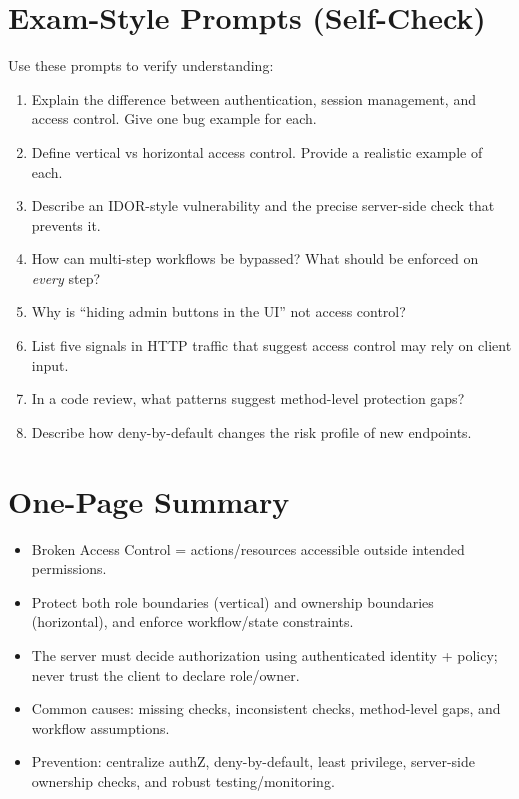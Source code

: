 \documentclass[11pt]{article}
\begin{document}
\section{Exam-Style Prompts (Self-Check)}
Use these prompts to verify understanding:
\begin{enumerate}
  \item Explain the difference between authentication, session management, and access control. Give one bug example for each.
  \item Define vertical vs horizontal access control. Provide a realistic example of each.
  \item Describe an IDOR-style vulnerability and the precise server-side check that prevents it.
  \item How can multi-step workflows be bypassed? What should be enforced on \emph{every} step?
  \item Why is ``hiding admin buttons in the UI'' not access control?
  \item List five signals in HTTP traffic that suggest access control may rely on client input.
  \item In a code review, what patterns suggest method-level protection gaps?
  \item Describe how deny-by-default changes the risk profile of new endpoints.
\end{enumerate}

\section{One-Page Summary}
\begin{itemize}
  \item Broken Access Control = actions/resources accessible outside intended permissions.
  \item Protect both role boundaries (vertical) and ownership boundaries (horizontal), and enforce workflow/state constraints.
  \item The server must decide authorization using authenticated identity + policy; never trust the client to declare role/owner.
  \item Common causes: missing checks, inconsistent checks, method-level gaps, and workflow assumptions.
  \item Prevention: centralize authZ, deny-by-default, least privilege, server-side ownership checks, and robust testing/monitoring.
\end{itemize}
\end{document}

